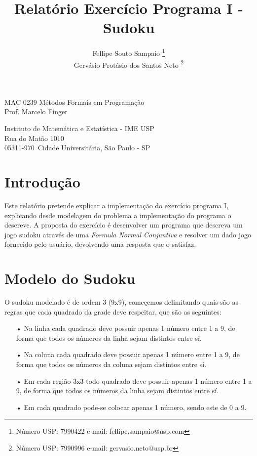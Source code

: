 \documentclass[a4paper]{article}
\title{Relatório Exercício Programa I - Sudoku}
\author{
Fellipe Souto Sampaio \footnote{Número USP: 7990422 e-mail: fellipe.sampaio@usp.com}\\
Gervásio Protásio dos Santos Neto \footnote{Número USP: 7990996 e-mail: gervasio.neto@usp.br}\\
}
\begin{document}
\maketitle

\begin{center}
MAC 0239 Métodos Formais em Programação \\
Prof. Marcelo Finger \\
             
\end{center}

\begin{center}
Instituto de Matemática e Estatística - IME USP \\
 Rua do Matão 1010 \\
 05311-970\, Cidade Universitária, São Paulo - SP \\
\end{center}

\newpage

\section{Introdução}
Este relatório pretende explicar a implementação do exercício programa I, explicando desde modelagem do problema a implementação do programa o descreve. A proposta do exercício é desenvolver um programa que descreva um jogo sudoku através de uma \textit{Formula Normal Conjuntiva} e resolver um dado jogo fornecido pelo usuário, devolvendo uma resposta que o satisfaz. 

\section{Modelo do Sudoku}
O sudoku modelado é de ordem 3 (9x9), começemos delimitando quais são as regras que cada quadrado da grade deve respeitar, que são as seguintes:

\begin{enumerate}
\item[•]{Na linha cada quadrado deve possuir apenas 1 número entre 1 a 9, de forma que todos os números da linha sejam distintos entre sí.}
\item[•]{Na coluna cada quadrado deve possuir apenas 1 número entre 1 a 9, de forma que todos os números da coluna sejam distintos entre sí.}
\item[•]{Em cada região 3x3 todo quadrado deve possuir apenas 1 número entre 1 a 9, de forma que todos os números da linha sejam distintos entre sí.}
\item[•]{Em cada quadrado pode-se colocar apenas 1 número, sendo este de 0 a 9.}
\end{enumerate}
\end{document}
